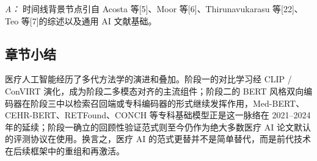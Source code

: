 \noindent\textit{A：} 时间线背景节点引自 Acosta 等[5]、Moor 等[6]、Thirunavukarasu 等[22]、Teo 等[7]的综述以及通用 AI 文献基础。

\subsection{章节小结}

医疗人工智能经历了多代方法学的演进和叠加。阶段一的对比学习经 CLIP / ConVIRT 演化，成为阶段二多模态对齐的主流组件；阶段二的 BERT 风格双向编码器在阶段三中以检索召回端或专科编码器的形式继续发挥作用，Med-BERT、CEHR-BERT、RETFound、CONCH 等专科基础模型正是这一脉络在 2021--2024 年的延续；阶段一确立的回顾性验证范式则至今仍作为绝大多数医疗 AI 论文默认的评测协议在使用。换言之，医疗 AI 的范式更替并不是简单替代，而是前代技术在后续框架中的重组和再激活。
